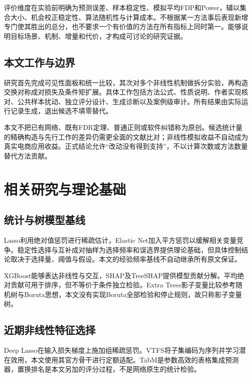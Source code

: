 \documentclass{sufethesismas}
\begin{document}
评价维度在实验前明确为预测误差、样本稳定性、模拟平均FDP和Power，辅以集合大小、机会校正稳定性、算法随机性与计算成本。不根据某一方法事后表现新增专门使其胜出的总分，也不要求一个有价值的方法在所有指标上同时第一。能够说明目标场景、机制、增量和代价，才构成可讨论的研究证据。

\section{本文工作与边界}

研究首先完成可见性面板和统一比较，其次对多个非线性机制做拆分实验，再构造交换对称成对损失及条件矩扩展。具体工作包括方法公式、性质说明、作者实现核对、公共样本扰动、独立评分设计、生成诊断以及案例级审计。所有结果由实际运行记录生成，退出候选不填零替代。

本文不把已有网络、既有FDR定理、普通正则或软件纠错称为原创。候选统计量的精确构造与先行工作的差异仍需更全面的文献比对；非线性模拟收益不自动成为真实电商应用收益。正式结论允许``改动没有得到支持''，不以计算次数或方法数量替代方法贡献。

\chapter{相关研究与理论基础}

\section{统计与树模型基线}

Lasso利用绝对值惩罚进行稀疏估计，Elastic Net加入平方惩罚以缓解相关变量竞争\cite{lasso1996,elastic2005}。稳定性选择与互补成对抽样为选择频率和误选界提供理论基础，但具体控制结论取决于选择量、阈值与假设\cite{stability2010,cpss2013}。本文的经验频率基线不自动继承所有原文保证。

XGBoost能够表达非线性与交互，SHAP及TreeSHAP提供模型贡献分解\cite{xgb2016,shap2017,treeshap2020}。平均绝对贡献可用于排序，但不等价于条件独立检验。Extra Trees影子变量比较参考随机树与Boruta思想，本文没有实现Boruta全部检验和停止规则，故只称影子变量树\cite{extratrees2006,boruta2010}。

\section{近期非线性特征选择}

Deep Lasso在输入损失梯度上施加组稀疏惩罚\cite{deeplasso2023}。VTFS将子集编码为序列并学习潜在效用，本文使用其官方骨干进行定额适配\cite{vtfs2024}。TabM是参数高效的表格集成预测器，置换排名是本文另加的评分过程，不是网络原生的统计检验\cite{tabm2025}。
\end{document}
